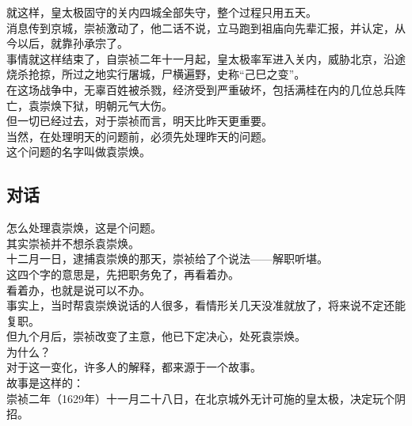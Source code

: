 \begin{multicols}{\theparacolNo}
就这样，皇太极固守的关内四城全部失守，整个过程只用五天。\\

消息传到京城，崇祯激动了，他二话不说，立马跑到祖庙向先辈汇报，并认定，从今以后，就靠孙承宗了。\\

事情就这样结束了，自崇祯二年十一月起，皇太极率军进入关内，威胁北京，沿途烧杀抢掠，所过之地实行屠城，尸横遍野，史称“己巳之变”。\\

在这场战争中，无辜百姓被杀戮，经济受到严重破坏，包括满桂在内的几位总兵阵亡，袁崇焕下狱，明朝元气大伤。\\

但一切已经过去，对于崇祯而言，明天比昨天更重要。\\

当然，在处理明天的问题前，必须先处理昨天的问题。\\

这个问题的名字叫做袁崇焕。\\

\subsection{对话}
怎么处理袁崇焕，这是个问题。\\

其实崇祯并不想杀袁崇焕。\\

十二月一日，逮捕袁崇焕的那天，崇祯给了个说法——解职听堪。\\

这四个字的意思是，先把职务免了，再看着办。\\

看着办，也就是说可以不办。\\

事实上，当时帮袁崇焕说话的人很多，看情形关几天没准就放了，将来说不定还能复职。\\

但九个月后，崇祯改变了主意，他已下定决心，处死袁崇焕。\\

为什么？\\

对于这一变化，许多人的解释，都来源于一个故事。\\

故事是这样的：\\

崇祯二年（1629年）十一月二十八日，在北京城外无计可施的皇太极，决定玩个阴招。\\


\end{multicols}
